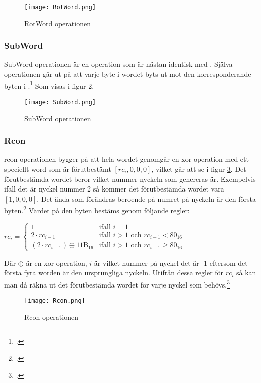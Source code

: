 \begin{figure}[H]
    \centering
    \texttt{[image: RotWord.png]}
    \caption{RotWord operationen}
    \label{fig:aes-rotword-pic}
\end{figure}

\subsubsection{SubWord}
\label{sec:aes-subword}

SubWord-operationen är en operation som är nästan identisk med . Själva operationen går ut på att varje \gls{byte} i wordet byts ut mot den korresponderande \gls{byte}n i .\footcite{daemen1999aes}
Som visas i figur \ref{fig:aes-subword-pic}.

\begin{figure}[H]
    \centering
    \texttt{[image: SubWord.png]}
    \caption{SubWord operationen}
    \label{fig:aes-subword-pic}
\end{figure}

\subsubsection{Rcon}
\label{sec:aes-rcon}

\acrshort{rcon}-operationen bygger på att hela wordet genomgår en \gls{xor}-operation med ett speciellt word som är förutbestämt $[rc_i, 0, 0, 0]$, vilket går att se i figur \ref{fig:aes-rcon-pic}.
Det förutbestämda wordet beror vilket nummer nyckeln som genereras är.
Exempelvis ifall det är nyckel nummer 2 så kommer det förutbestämda wordet vara $[1, 0, 0, 0]$. Det ända som förändras beroende på numret på nyckeln är den första \gls{byte}n.\footcite{daemen1999aes}
Värdet på den \gls{byte}n bestäms genom följande regler:

\begin{center}
    \begin{math}
        rc_i =
        \begin{cases}
            1 & \text{ifall } i = 1 \\
            2 \cdot rc_{i-1} & \text{ifall } i > 1 \text{ och } rc_{i-1} < 80_{16} \\
            (2 \cdot rc_{i-1}) \oplus \text {11B}_{16} & \text{ifall } i > 1 \text{ och } rc_{i-1} \ge 80_{16}
        \end{cases}
    \end{math}
\end{center}

Där $\oplus$ är en \gls{xor}-operation, $i$ är vilket nummer på nyckel det är -1 eftersom det första fyra worden är den ursprungliga nyckeln.
Utifrån dessa regler för $rc_i$ så kan man då räkna ut det förutbestämda wordet för varje nyckel som behövs.\footcite{daemen1999aes}

\begin{figure}[H]
    \centering
    \texttt{[image: Rcon.png]}
    \caption{Rcon operationen}
    \label{fig:aes-rcon-pic}
\end{figure}

